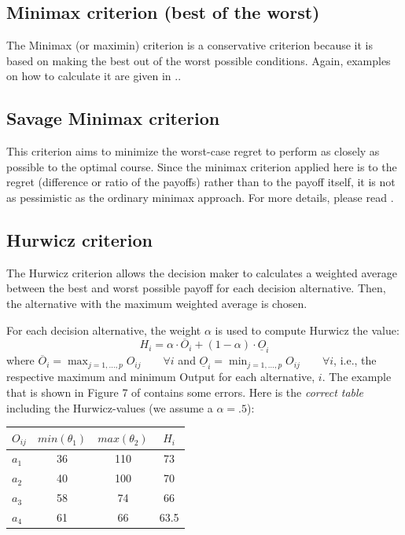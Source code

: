\documentclass[
  12pt,
  oneside]{book}
\theoremstyle{definition}
\theoremstyle{definition}
\theoremstyle{definition}
\theoremstyle{definition}
\theoremstyle{remark}
\begin{document}
\hypertarget{minimax-criterion-best-of-the-worst}{%
\subsection*{Minimax criterion (best of the worst)}\label{minimax-criterion-best-of-the-worst}}

The Minimax (or maximin) criterion is a conservative criterion because it is based on making the best out of the worst possible conditions. Again, examples on how to calculate it are given in \citet{Finne1998three}..

\hypertarget{savage-minimax-criterion}{%
\subsection*{Savage Minimax criterion}\label{savage-minimax-criterion}}

This criterion aims to minimize the worst-case regret to perform as closely as possible to the optimal course. Since the minimax criterion applied here is to the regret (difference or ratio of the payoffs) rather than to the payoff itself, it is not as pessimistic as the ordinary minimax approach. For more details, please read \citet{Finne1998three}.

\hypertarget{hurwicz-criterion}{%
\subsection*{Hurwicz criterion}\label{hurwicz-criterion}}

The Hurwicz criterion allows the decision maker to calculates a weighted average between the best and worst possible payoff for each decision alternative. Then, the alternative with the maximum weighted average is chosen.

For each decision alternative, the weight \(\alpha\) is used to compute Hurwicz the value:
\[H_i=\alpha \cdot \overline{O}_i + (1-\alpha)\cdot \underline{O}_i\]
where \(\overline{O}_i=\max_{j=1,\dots,p}{O_{ij}}\qquad \forall i\) and \(\underline{O}_i=\min_{j=1,\dots,p}{O_{ij}}\qquad \forall i\), i.e., the respective maximum and minimum Output for each alternative, \(i\).
The example that is shown in Figure 7 of \citet[p.401]{Finne1998three} contains some errors. Here is the \emph{correct table} including the Hurwicz-values (we assume a \(\alpha=.5\)):

\begin{longtable}[]{@{}lccc@{}}
\toprule\noalign{}
\(O_{ij}\) & \(min(\theta_1)\) & \(max(\theta_2)\) & \(H_i\) \\
\midrule\noalign{}
\endhead
\bottomrule\noalign{}
\endlastfoot
\(a_1\) & 36 & 110 & 73 \\
\(a_2\) & 40 & 100 & 70 \\
\(a_3\) & 58 & 74 & 66 \\
\(a_4\) & 61 & 66 & 63.5 \\
\end{longtable}
\end{document}
